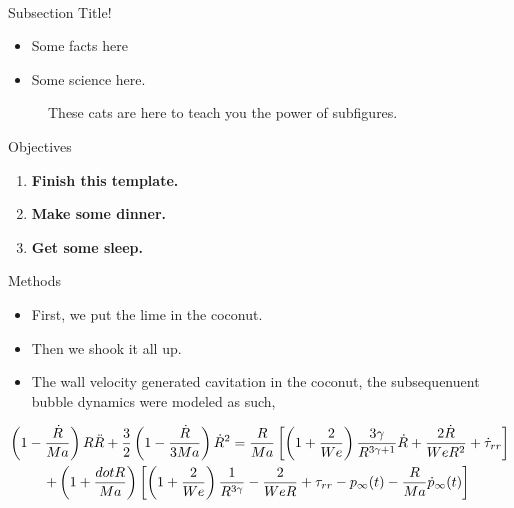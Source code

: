 \documentclass[final]{beamer}
\begin{document}
\begin{frame}[plain]{}
\begin{center}
\begin{minipage}[t]{.23\linewidth}
	{\LARGE {}}\\
	\begin{block}{\Large Subsection Title!}
          \begin{itemize}
	    \item Some facts here
	    \item Some science here.
	    
	  \end{itemize}
  
	  \begin{figure} 
	    \centering
	    \hspace{.5cm}
	    \hspace{1cm}
	    \caption{\normalsize These cats are here to teach you the power of subfigures.}
	    \label{fig:CEUS}
	  \end{figure}

	\end{block}\vspace*{1.cm}


	\begin{block}{\Large Objectives}\vspace*{-0.4cm}
	  \begin{enumerate}\normalsize
	    \item \textbf{Finish this template.}
	    \item \textbf{Make some dinner.}
	    \item \textbf{Get some sleep.}

	  \end{enumerate}
	  
	\end{block} \vspace*{1cm}
	
	\begin{block}{\Large Methods}
	  \begin{itemize}
	  \item First, we put the lime in the coconut.
	  \item Then we shook it all up.
	  \item The wall velocity generated cavitation in the coconut, the subsequenuent bubble dynamics were modeled as such,
	  \end{itemize}{\small
	  \begin{align*}
	  \left(1-\frac{\dot{R}}{Ma}\right)R\ddot{R} + \frac{3}{2}\left(1-\frac{\dot{R}}{3 Ma}\right)\dot{R}^2 = \frac{R}{Ma}\left[\left(1+\frac{2}{We}\right)\frac{3\gamma}{R^{3\gamma+1}}\dot{R}+\frac{2\dot{R}}{We R^2} +\dot{\tau}_{rr}\right] \\ \hspace*{-1cm}
	 + \left(1 + \frac{dot{R}}{Ma}\right)\left[\left(1 + \frac{2}{We}\right)\frac{1}{R^{3\gamma}}-\frac{2}{We R} + \tau_{rr} -p_\infty(t) -\frac{R}{Ma}\dot{p}_\infty(t)\right] \hspace*{1cm}
		  \end{align*}}
		  

\end{block}
\end{minipage}
\end{center}
\end{frame}
\end{document}
